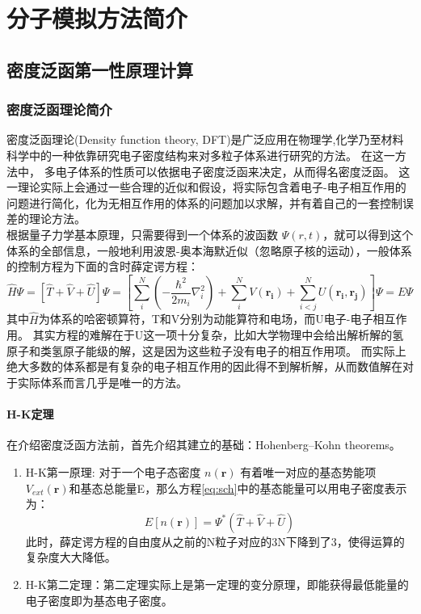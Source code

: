 \chapter{分子模拟方法简介}
\section{密度泛函第一性原理计算}
\subsection{密度泛函理论简介}
密度泛函理论(Density function theory, DFT)是广泛应用在物理学,化学乃至材料科学中的一种依靠研究电子密度结构来对多粒子体系进行研究的方法。 在这一方法中， 多电子体系的性质可以依据电子密度泛函来决定，从而得名密度泛函。 这一理论实际上会通过一些合理的近似和假设，将实际包含着电子-电子相互作用的问题进行简化，化为无相互作用的体系的问题加以求解，并有着自己的一套控制误差的理论方法。\\
\indent 根据量子力学基本原理，只需要得到一个体系的波函数 $\Psi(r,t)$，就可以得到这个体系的全部信息，一般地利用波恩-奥本海默近似（忽略原子核的运动），一般体系的控制方程为下面的含时薛定谔方程：
\begin{equation}
\label{eq:sch}
\widehat{H} \Psi = \left[ \widehat{T} + \widehat{V} +\widehat{U} \right] \Psi = \left[ \sum^N_i \left( -\frac{\hbar^2}{2m_i} \nabla^2_i \right) + \sum^N_i V(\mathbf{r_i}) + \sum^N_{i < j} U(\mathbf{r_i},\mathbf{r_j}) \right] \Psi = E \Psi
\end{equation}
其中$\widehat{H}$为体系的哈密顿算符，T和V分别为动能算符和电场，而U电子-电子相互作用。 其实方程的难解在于U这一项十分复杂，比如大学物理中会给出解析解的氢原子和类氢原子能级的解，这是因为这些粒子没有电子的相互作用项。 而实际上绝大多数的体系都是有复杂的电子相互作用的因此得不到解析解，从而数值解在对于实际体系而言几乎是唯一的方法。\\
\subsubsection*{H-K定理}
\indent 在介绍密度泛函方法前，首先介绍其建立的基础：Hohenberg–Kohn theorems。
\begin{enumerate}
	\item H-K第一原理: 对于一个电子态密度 $n(\mathbf{r})$ 有着唯一对应的基态势能项$V_{ext}(\mathbf{r})$和基态总能量E，那么方程\ref{eq:sch}中的基态能量可以用电子密度表示为：
	\begin{equation}
	E[n(\mathbf{r})] = \Psi^{*} \left(
	\widehat{T} + \widehat{V} +\widehat{U} \right)
	\end{equation}
	此时，薛定谔方程的自由度从之前的N粒子对应的3N下降到了3，使得运算的复杂度大大降低。
	\item H-K第二定理：第二定理实际上是第一定理的变分原理，即能获得最低能量的电子密度即为基态电子密度。

\end{enumerate}
